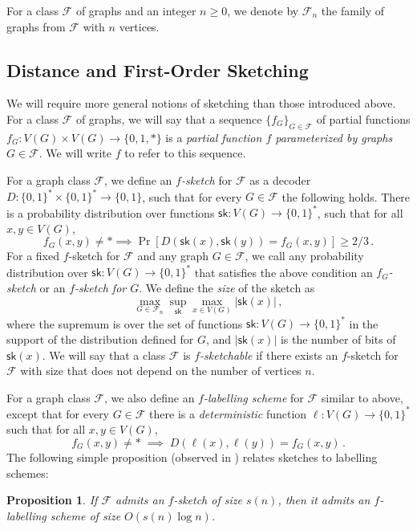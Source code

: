 \documentclass[11pt]{article}
\newtheorem{proposition}[thm]{Proposition}
\theoremstyle{definition}
\newcommand{\zo}{\{0,1\}}
\newcommand{\sk}{\mathsf{sk}}
\renewcommand{\ge}{\geqslant}
\renewcommand{\geq}{\geqslant}
\def\F {{\mathcal F}}
\def\sk {\mathsf{sk}}
\begin{document}
\noindent For a class $\F$ of
graphs and an integer $n\ge 0$, we denote by $\F_n$ the family of
graphs from $\F$ with $n$ vertices.

\subsection{Distance and First-Order Sketching}
\label{section:sketching definitions}

We will require more general notions of sketching than those introduced above.  For a class $\F$ of
graphs, we will say that a sequence $\{ f_G \}_{G \in \F}$ of partial functions $f_G : V(G) \times
V(G) \to \{0,1,*\}$ is a \emph{partial function $f$ parameterized by graphs $G \in \F$}. We will
write $f$ to refer to this sequence.

For a graph class $\F$, we define an \emph{$f$-sketch} for $\F$ as a decoder $D : \zo^* \times \zo^*
\to \zo$, such that for every $G \in \F$ the following holds. There is a probability distribution
over functions $\sk : V(G) \to \zo^*$, such that for all $x,y \in V(G)$,
\[
  f_G(x,y) \neq * \implies \Pr[ D(\sk(x), \sk(y)) = f_G(x,y) ] \geq 2/3 \,.
\]
For a fixed  $f$-sketch for $\F$ and any graph $G \in \F$,  we call any probability distribution
over $\sk : V(G) \to \zo^*$ that satisfies the above condition an \emph{$f_G$-sketch} or an
\emph{$f$-sketch for $G$}.
\noindent
We define the \emph{size} of the sketch as
\[
\max_{G \in \F_n} \sup_{\sk} \max_{x \in V(G)} |\sk(x)| \,,
\]
\noindent
where the supremum is over the set of functions $\sk : V(G) \to \zo^*$ in the support of the
distribution defined for $G$, and $|\sk(x)|$ is the number of bits of $\sk(x)$. We will say that a
class $\F$ is \emph{$f$-sketchable} if there exists an $f$-sketch for $\F$ with size that does not
depend on the number of vertices $n$.

For a graph class $\F$, we also define an \emph{$f$-labelling scheme} for $\F$ similar to above,
except that for every $G \in \F$ there is a \emph{deterministic} function $\ell : V(G) \to \zo^*$
such that for all $x,y \in V(G)$,
\[
  f_G(x,y) \neq * \;\implies\; D(\ell(x), \ell(y)) = f_G(x,y) \,.
\]
\noindent
The following simple proposition (observed in \cite{Har20,HWZ21}) relates sketches to labelling
schemes:
\begin{proposition}
\label{prop:derandomization}
If $\F$ admits an $f$-sketch of size $s(n)$, then it admits an $f$-labelling scheme of size $O(s(n)
\log n)$.
\end{proposition}
\end{document}
